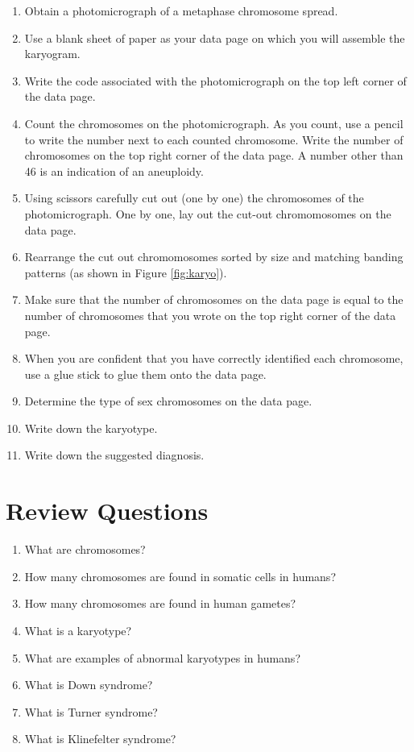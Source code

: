 \documentclass[]{book}
\providecommand{\tightlist}{%
  \setlength{\itemsep}{0pt}\setlength{\parskip}{0pt}}
\begin{document}
\begin{enumerate}
\def\labelenumi{\arabic{enumi}.}
\tightlist
\item
  Obtain a photomicrograph of a metaphase chromosome spread.
\item
  Use a blank sheet of paper as your data page on which you will
  assemble the karyogram.
\item
  Write the code associated with the photomicrograph on the top left
  corner of the data page.
\item
  Count the chromosomes on the photomicrograph. As you count, use a
  pencil to write the number next to each counted chromosome. Write the
  number of chromosomes on the top right corner of the data page. A
  number other than 46 is an indication of an aneuploidy.
\item
  Using scissors carefully cut out (one by one) the chromosomes of the
  photomicrograph. One by one, lay out the cut-out chromomosomes on the
  data page.
\item
  Rearrange the cut out chromomosomes sorted by size and matching
  banding patterns (as shown in Figure \ref{fig:karyo}).
\item
  Make sure that the number of chromosomes on the data page is equal to
  the number of chromosomes that you wrote on the top right corner of
  the data page.
\item
  When you are confident that you have correctly identified each
  chromosome, use a glue stick to glue them onto the data page.
\item
  Determine the type of sex chromosomes on the data page.
\item
  Write down the karyotype.
\item
  Write down the suggested diagnosis.
\end{enumerate}

\section{Review Questions}\label{review-questions-2}

\begin{enumerate}
\def\labelenumi{\arabic{enumi}.}
\tightlist
\item
  What are chromosomes?
\item
  How many chromosomes are found in somatic cells in humans?
\item
  How many chromosomes are found in human gametes?
\item
  What is a karyotype?
\item
  What are examples of abnormal karyotypes in humans?
\item
  What is Down syndrome?
\item
  What is Turner syndrome?
\item
  What is Klinefelter syndrome?
\end{enumerate}
\end{document}
